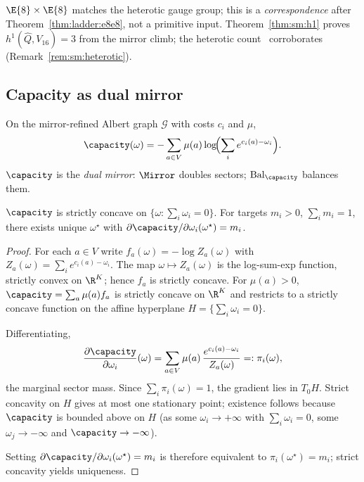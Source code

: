 \begin{remark}\label{rem:ladder:heterotic}
$\E{8}\times\E{8}$ matches the heterotic gauge group; this is a
\emph{correspondence} after Theorem~\ref{thm:ladder:e8e8}, not a primitive
input. Theorem~\ref{thm:sm:h1} proves $h^1(\hat Q,V_{16})=3$ from the mirror climb;
the heterotic count~\cite{Witten1985} corroborates (Remark~\ref{rem:sm:heterotic}).
\end{remark}

\subsection{Capacity as dual mirror}
\label{sec:ladder:capacity}

\begin{definition}\label{def:ladder:capacity}
On the mirror-refined Albert graph $\mathcal{G}$ with costs $c_i$ and $\mu$,
\begin{equation}\label{eq:ladder:capacity}
  \capacity(\omega)=-\sum_{a\in V}\mu(a)\log\!\Bigl(\sum_{i}
  e^{c_i(a)-\omega_i}\Bigr).
\end{equation}
$\capacity$ is the \emph{dual mirror}: $\Mirror$ doubles sectors;
$\mathrm{Bal}_\capacity$ balances them.
\end{definition}

\begin{theorem}\label{thm:ladder:concave}
$\capacity$ is strictly concave on $\{\omega:\sum_i\omega_i=0\}$. For targets
$m_i>0$, $\sum_i m_i=1$, there exists unique $\omega^\star$ with
$\partial\capacity/\partial\omega_i(\omega^\star)=m_i$.
\end{theorem}

\begin{proof}
For each $a\in V$ write $f_a(\omega)=-\log Z_a(\omega)$ with
$Z_a(\omega)=\sum_i e^{c_i(a)-\omega_i}$. The map $\omega\mapsto Z_a(\omega)$
is the log-sum-exp function, strictly convex on $\R^K$; hence $f_a$ is strictly
concave. For $\mu(a)>0$, $\capacity=\sum_a\mu(a)f_a$ is strictly concave on
$\R^K$ and restricts to a strictly concave function on the affine hyperplane
$H=\{\sum_i\omega_i=0\}$.

Differentiating,
\[
  \frac{\partial\capacity}{\partial\omega_i}(\omega)
  =\sum_{a\in V}\mu(a)\,
  \frac{e^{c_i(a)-\omega_i}}{Z_a(\omega)}
  =:\pi_i(\omega),
\]
the marginal sector mass. Since $\sum_i\pi_i(\omega)=1$, the gradient lies in
$T_0H$. Strict concavity on $H$ gives at most one stationary point; existence
follows because $\capacity$ is bounded above on $H$ (as some $\omega_i\to+\infty$
with $\sum_i\omega_i=0$, some $\omega_j\to-\infty$ and $\capacity\to-\infty$).

Setting $\partial\capacity/\partial\omega_i(\omega^\star)=m_i$ is therefore
equivalent to $\pi_i(\omega^\star)=m_i$; strict concavity yields uniqueness.
\end{proof}

